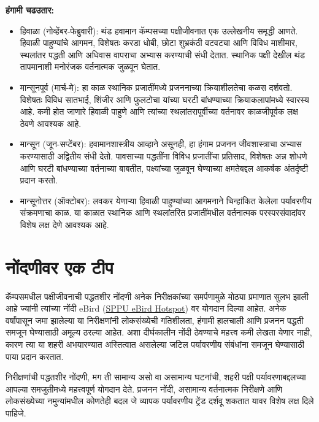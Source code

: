 \documentclass[a4paper,12pt,landscape]{memoir}
\begin{document}
{  \textbf{हंगामी चढउतार:}
  \begin{itemize}
  \item हिवाळा (नोव्हेंबर-फेब्रुवारी): थंड हवामान कॅम्पसच्या पक्षीजीवनात एक उल्लेखनीय समृद्धी आणते. हिवाळी पाहुण्यांचे आगमन, विशेषतः करडा धोबी, छोटा शुभ्रकंठी वटवट्या आणि विविध माशीमार, स्थलांतर पद्धती आणि अधिवास वापराचा अभ्यास करण्याची संधी देतात. स्थानिक पक्षी देखील थंड तापमानाशी मनोरंजक वर्तनात्मक जुळवून घेतात.
  
  \item मान्सूनपूर्व (मार्च-मे): हा काळ स्थानिक प्रजातींमध्ये प्रजननाच्या क्रियाशीलतेचा कळस दर्शवतो. विशेषतः विविध सातभाई, शिंजीर आणि फुलटोचा यांच्या घरटी बांधण्याच्या क्रियाकलापांमध्ये स्वारस्य आहे. कमी होत जाणारे हिवाळी पाहुणे आणि त्यांच्या स्थलांतरापूर्वीच्या वर्तनावर काळजीपूर्वक लक्ष ठेवणे आवश्यक आहे.
  
  \item मान्सून (जून-सप्टेंबर): हवामानशास्त्रीय आव्हाने असूनही, हा हंगाम प्रजनन जीवशास्त्राचा अभ्यास करण्यासाठी अद्वितीय संधी देतो. पावसाच्या पद्धतींना विविध प्रजातींचा प्रतिसाद, विशेषतः अन्न शोधणे आणि घरटी बांधण्याच्या वर्तनाच्या बाबतीत, पक्ष्यांच्या जुळवून घेण्याच्या क्षमतेबद्दल आकर्षक अंतर्दृष्टी प्रदान करतो.
  
  \item मान्सूनोत्तर (ऑक्टोबर): लवकर येणाऱ्या हिवाळी पाहुण्यांच्या आगमनाने चिन्हांकित केलेला पर्यावरणीय संक्रमणाचा काळ. या काळात स्थानिक आणि स्थलांतरित प्रजातींमधील वर्तनात्मक परस्परसंवादांवर विशेष लक्ष देणे आवश्यक आहे.
  \end{itemize}
}{%
  \section*{\textbf{नोंदणीवर एक टीप}}
  कॅम्पसमधील पक्षीजीवनाची पद्धतशीर नोंदणी अनेक निरीक्षकांच्या समर्पणामुळे मोठ्या प्रमाणात सुलभ झाली आहे ज्यांनी त्यांच्या नोंदी {\latintext eBird} ({\latintext \href{https://ebird.org/hotspot/L1838309}{SPPU eBird Hotspot}}) वर योगदान दिल्या आहेत. अनेक वर्षांपासून जमा झालेल्या या निरीक्षणांनी लोकसंख्येची गतिशीलता, हंगामी हालचाली आणि प्रजनन पद्धती समजून घेण्यासाठी अमूल्य ठरल्या आहेत. अशा दीर्घकालीन नोंदी ठेवण्याचे महत्त्व कमी लेखता येणार नाही, कारण त्या या शहरी अभयारण्यात अस्तित्वात असलेल्या जटिल पर्यावरणीय संबंधांना समजून घेण्यासाठी पाया प्रदान करतात.

  निरीक्षणांची पद्धतशीर नोंदणी, मग ती सामान्य असो वा असामान्य घटनांची, शहरी पक्षी पर्यावरणाबद्दलच्या आपल्या समजुतीमध्ये महत्त्वपूर्ण योगदान देते. प्रजनन नोंदी, असामान्य वर्तनात्मक निरीक्षणे आणि लोकसंख्येच्या नमुन्यांमधील कोणतेही बदल जे व्यापक पर्यावरणीय ट्रेंड दर्शवू शकतात यावर विशेष लक्ष दिले पाहिजे.
}
\end{document}
